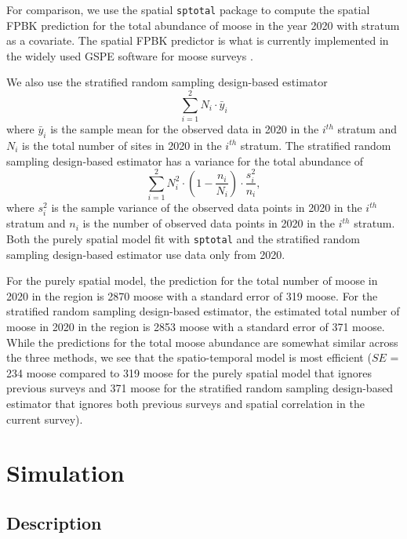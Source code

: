 \documentclass[]{interact}
\theoremstyle{plain}%
\theoremstyle{definition}
\theoremstyle{remark}
\begin{document}
For comparison, we use the spatial \texttt{sptotal} package
\citep{higham2021sptotal} to compute the spatial FPBK prediction
\citep{ver2008spatial} for the total abundance of moose in the year 2020
with stratum as a covariate. The spatial FPBK predictor is what is
currently implemented in the widely used GSPE software for moose surveys
\citep{delong2006geospatial}.

We also use the stratified random sampling design-based estimator
\mbox{} \begin{equation*}
\sum_{i = 1}^{2} N_i \cdot \bar{y}_i
\end{equation*} \noindent where \(\bar{y}_i\) is the sample mean for the
observed data in 2020 in the \(i^{th}\) stratum and \(N_i\) is the total
number of sites in 2020 in the \(i^{th}\) stratum. The stratified random
sampling design-based estimator has a variance for the total abundance
of \mbox{} \begin{equation*}
\sum_{i = 1}^{2} N_i^2 \cdot (1 - \frac{n_i}{N_i}) \cdot \frac{s^2_i}{n_i},
\end{equation*} \noindent where \(s^2_i\) is the sample variance of the
observed data points in 2020 in the \(i^{th}\) stratum and \(n_i\) is
the number of observed data points in 2020 in the \(i^{th}\) stratum.
Both the purely spatial model fit with \texttt{sptotal} and the
stratified random sampling design-based estimator use data only from
2020.

For the purely spatial model, the prediction for the total number of
moose in 2020 in the region is 2870 moose with a standard error of 319
moose. For the stratified random sampling design-based estimator, the
estimated total number of moose in 2020 in the region is 2853 moose with
a standard error of 371 moose. While the predictions for the total moose
abundance are somewhat similar across the three methods, we see that the
spatio-temporal model is most efficient (\(SE\) = 234 moose compared to
319 moose for the purely spatial model that ignores previous surveys and
371 moose for the stratified random sampling design-based estimator that
ignores both previous surveys and spatial correlation in the current
survey).

\section{Simulation} \label{section:Simulation}

\subsection{Description}
\end{document}
